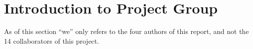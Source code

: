 \chapter{Introduction to Project Group}
As of this section ``we'' only refers to the four authors of this report, and not the 14 collaborators of this project.




